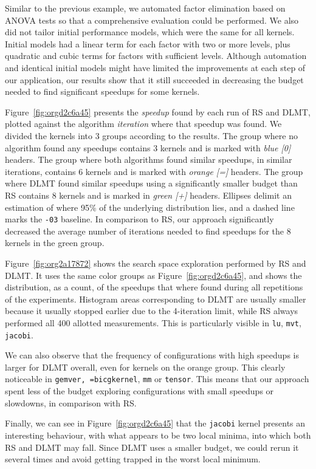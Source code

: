 \documentclass[conference]{IEEEtran}
\begin{document}
Similar to the previous example, we automated factor elimination based on ANOVA
tests so that a comprehensive evaluation could be performed. We also did not
tailor initial performance models, which were the same for all kernels.
Initial models had a linear term for each factor with two or more levels, plus
quadratic and cubic terms for factors with sufficient levels. Although
automation and identical initial models might have limited the improvements at
each step of our application, our results show that it still succeeded in
decreasing the budget needed to find significant speedups for some kernels.

Figure~\ref{fig:orgd2c6a45} presents the \emph{speedup} found by each
run of RS and DLMT, plotted against the algorithm \emph{iteration} where that speedup
was found. We divided the kernels into 3 groups according to the results. The
group where no algorithm found any speedups contains 3 kernels and is marked
with \emph{blue [0]} headers. The group where both algorithms found similar speedups, in
similar iterations, contains 6 kernels and is marked with \emph{orange [=]} headers. The
group where DLMT found similar speedups using a significantly smaller budget
than RS contains 8 kernels and is marked in \emph{green [+]} headers. Ellipses delimit an
estimation of where 95\% of the underlying distribution lies, and a dashed line
marks the \texttt{-03} baseline. In comparison to RS, our approach significantly
decreased the average number of iterations needed to find speedups for the 8
kernels in the green group.

Figure~\ref{fig:org2a17872} shows the search space exploration performed
by RS and DLMT. It uses the same color groups as
Figure~\ref{fig:orgd2c6a45}, and shows the distribution, as a
count, of the speedups that where found during all repetitions of the
experiments. Histogram areas corresponding to DLMT are usually smaller because
it usually stopped earlier due to the 4-iteration limit, while RS always
performed all 400 allotted measurements. This is particularly visible in \texttt{lu},
\texttt{mvt}, \texttt{jacobi}.

We can also observe that the frequency of configurations with high speedups is
larger for DLMT overall, even for kernels on the orange group. This clearly
noticeable in \texttt{gemver, =bicgkernel}, \texttt{mm} or \texttt{tensor}. This means that our
approach spent less of the budget exploring configurations with small speedups
or slowdowns, in comparison with RS.

Finally, we can see in Figure~\ref{fig:orgd2c6a45} that the
\texttt{jacobi} kernel presents an interesting behaviour, with what appears to be two
local minima, into which both RS and DLMT may fall. Since DLMT uses a smaller
budget, we could rerun it several times and avoid getting trapped in the worst
local minimum.
\end{document}
